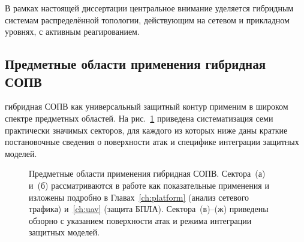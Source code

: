 В рамках настоящей диссертации центральное внимание уделяется
гибридным системам распределённой топологии, действующим на сетевом
и прикладном уровнях, с активным реагированием.

\subsection{Предметные области применения гибридная СОПВ}
\label{subsec:idps_sectors}

гибридная СОПВ как универсальный защитный контур применим в широком
спектре предметных областей. На рис.~\ref{fig:orga_apps_idps}
приведена систематизация семи практически значимых секторов, для
каждого из которых ниже даны краткие постановочные сведения о
поверхности атак и специфике интеграции защитных моделей.

\begin{figure}[htbp]
\centering
{}
\caption{Предметные области применения гибридная СОПВ. Сектора~(а) и~(б)
рассматриваются в работе как показательные применения и
изложены подробно в Главах~\ref{ch:platform} (анализ сетевого
трафика) и~\ref{ch:uav} (защита БПЛА). Сектора~(в)--(ж) приведены
обзорно с указанием поверхности атак и режима интеграции защитных
моделей.}
\label{fig:orga_apps_idps}
\end{figure}

